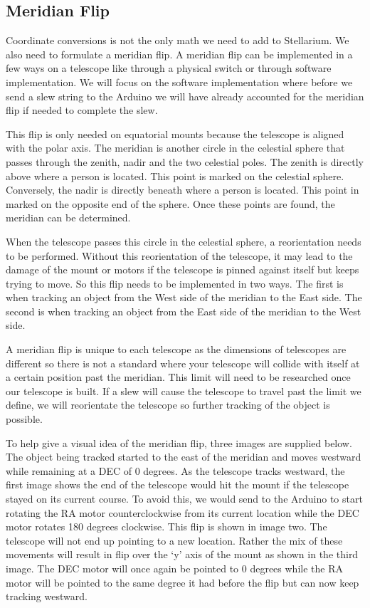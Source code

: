 \documentclass[12pt]{report}
\begin{document}
\subsection*{Meridian Flip}

Coordinate conversions is not the only math we need to add to Stellarium. We also need to formulate a meridian flip. A meridian flip can be implemented in a few ways on a telescope like through a physical switch or through software implementation. We will focus on the software implementation where before we send a slew string to the Arduino we will have already accounted for the meridian flip if needed to complete the slew.

This flip is only needed on equatorial mounts because the telescope is aligned with the polar axis. The meridian is another circle in the celestial sphere that passes through the zenith, nadir and the two celestial poles. The zenith is directly above where a person is located. This point is marked on the celestial sphere. Conversely, the nadir is directly beneath where a person is located. This point in marked on the opposite end of the sphere. Once these points are found, the meridian can be determined.

When the telescope passes this circle in the celestial sphere, a reorientation needs to be performed. Without this reorientation of the telescope, it may lead to the damage of the mount or motors if the telescope is pinned against itself but keeps trying to move. So this flip needs to be implemented in two ways. The first is when tracking an object from the West side of the meridian to the East side. The second is when tracking an object from the East side of the meridian to the West side.

A meridian flip is unique to each telescope as the dimensions of telescopes are different so there is not a standard where your telescope will collide with itself at a certain position past the meridian. This limit will need to be researched once our telescope is built. If a slew will cause the telescope to travel past the limit we define, we will reorientate the telescope so further tracking of the object is possible.

To help give a visual idea of the meridian flip, three images are supplied below. The object being tracked started to the east of the meridian and moves westward while remaining at a DEC of 0 degrees. As the telescope tracks westward, the first image shows the end of the telescope would hit the mount if the telescope stayed on its current course. To avoid this, we would send to the Arduino to start rotating the RA motor counterclockwise from its current location while the DEC motor rotates 180 degrees clockwise. This flip is shown in image two. The telescope will not end up pointing to a new location. Rather the mix of these movements will result in flip over the ‘y’ axis of the mount as shown in the third image. The DEC motor will once again be pointed to 0 degrees while the RA motor will be pointed to the same degree it had before the flip but can now keep tracking westward.
\end{document}
